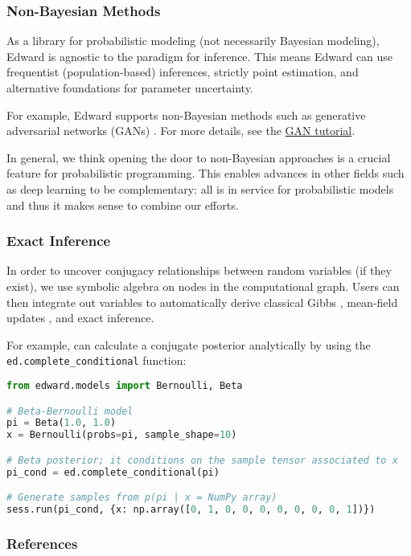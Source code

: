 \subsubsection{Non-Bayesian Methods}

As a library for probabilistic modeling (not necessarily Bayesian
modeling), Edward is agnostic to the paradigm for inference.  This
means Edward can use frequentist (population-based) inferences,
strictly point estimation, and alternative foundations for parameter
uncertainty.

For example, Edward supports non-Bayesian methods such as generative
adversarial networks (GANs)
\citep{goodfellow2014generative}.
For more details, see the \href{/tutorials/gan}{GAN tutorial}.

In general, we think opening the door to non-Bayesian approaches is a
crucial feature for probabilistic programming. This enables advances
in other fields such as deep learning to be complementary: all is in
service for probabilistic models and thus it makes sense to combine
our efforts.

\subsubsection{Exact Inference}

In order to uncover conjugacy relationships between random variables
(if they exist), we use symbolic algebra on nodes in the computational
graph.  Users can then integrate out variables to automatically derive
classical Gibbs \citep{gelfand1990sampling},
mean-field updates \citep{bishop2006pattern}, and exact inference.

For example,  can calculate a conjugate posterior analytically by
using the \texttt{ed.complete_conditional} function:

\begin{lstlisting}[language=Python]
from edward.models import Bernoulli, Beta

# Beta-Bernoulli model
pi = Beta(1.0, 1.0)
x = Bernoulli(probs=pi, sample_shape=10)

# Beta posterior; it conditions on the sample tensor associated to x
pi_cond = ed.complete_conditional(pi)

# Generate samples from p(pi | x = NumPy array)
sess.run(pi_cond, {x: np.array([0, 1, 0, 0, 0, 0, 0, 0, 0, 1])})
\end{lstlisting}

\subsubsection{References}\label{references}
